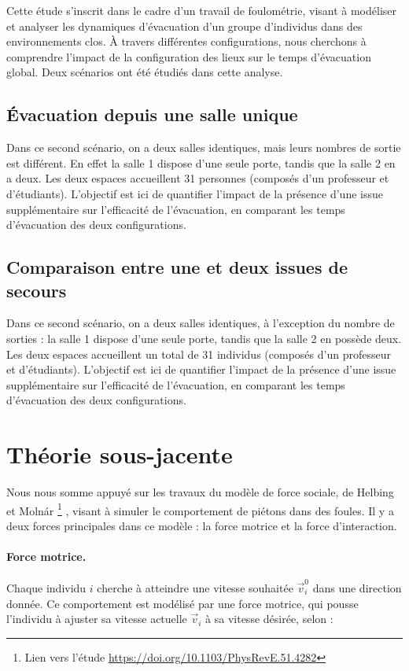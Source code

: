\documentclass[a4paper,12pt]{article}
\begin{document}
Cette étude s’inscrit dans le cadre d’un travail de foulométrie, visant à modéliser et analyser les dynamiques d’évacuation d’un groupe d’individus dans des environnements clos. À travers différentes configurations, nous cherchons à comprendre l’impact de la configuration des lieux sur le temps d’évacuation global. Deux scénarios ont été étudiés dans cette analyse.

\subsection{Évacuation depuis une salle unique}

Dans ce second scénario, on a deux salles identiques, mais leurs nombres de sortie est différent. En effet la salle 1 dispose d’une seule porte, tandis que la salle 2 en a deux. Les deux espaces accueillent 31 personnes (composés d'un professeur et d'étudiants).
L’objectif est ici de quantifier l’impact de la présence d’une issue supplémentaire sur l’efficacité de l’évacuation, en comparant les temps d’évacuation des deux configurations.

\subsection{Comparaison entre une et deux issues de secours}

Dans ce second scénario, on a deux salles identiques, à l’exception du nombre de sorties : la salle 1 dispose d’une seule porte, tandis que la salle 2 en possède deux. Les deux espaces accueillent un total de 31 individus (composés d'un professeur et d'étudiants).
L’objectif est ici de quantifier l’impact de la présence d’une issue supplémentaire sur l’efficacité de l’évacuation, en comparant les temps d’évacuation des deux configurations.
\
\section{Théorie sous-jacente}

Nous nous somme appuyé sur les travaux du modèle de force sociale, de Helbing et Molnár
\footnote{Lien vers l'étude \url{https://doi.org/10.1103/PhysRevE.51.4282}}
, visant à simuler le comportement de piétons dans des foules. Il y a deux forces principales dans ce modèle : la force motrice et la force d'interaction.

\paragraph{Force motrice.}
Chaque individu $i$ cherche à atteindre une vitesse souhaitée $\vec{v}_i^0$ dans une direction donnée. Ce comportement est modélisé par une force motrice, qui pousse l'individu à ajuster sa vitesse actuelle $\vec{v}_i$ à sa vitesse désirée, selon :
\end{document}
